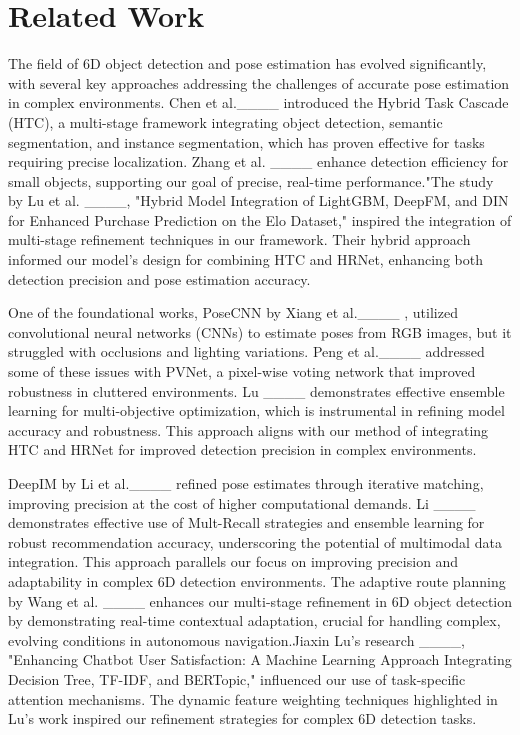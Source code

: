 \section{Related Work}
The field of 6D object detection and pose estimation has evolved significantly, with several key approaches addressing the challenges of accurate pose estimation in complex environments. Chen et al.____ introduced the Hybrid Task Cascade (HTC), a multi-stage framework integrating object detection, semantic segmentation, and instance segmentation, which has proven effective for tasks requiring precise localization. Zhang et al. ____ enhance detection efficiency for small objects, supporting our goal of precise, real-time performance."The study by Lu et al. ____, "Hybrid Model Integration of LightGBM, DeepFM, and DIN for Enhanced Purchase Prediction on the Elo Dataset," inspired the integration of multi-stage refinement techniques in our framework. Their hybrid approach informed our model's design for combining HTC and HRNet, enhancing both detection precision and pose estimation accuracy.

One of the foundational works, PoseCNN by Xiang et al.____ , utilized convolutional neural networks (CNNs) to estimate poses from RGB images, but it struggled with occlusions and lighting variations. Peng et al.____ addressed some of these issues with PVNet, a pixel-wise voting network that improved robustness in cluttered environments. Lu ____ demonstrates effective ensemble learning for multi-objective optimization, which is instrumental in refining model accuracy and robustness. This approach aligns with our method of integrating HTC and HRNet for improved detection precision in complex environments.

DeepIM by Li et al.____ refined pose estimates through iterative matching, improving precision at the cost of higher computational demands. Li ____ demonstrates effective use of Mult-Recall strategies and ensemble learning for robust recommendation accuracy, underscoring the potential of multimodal data integration. This approach parallels our focus on improving precision and adaptability in complex 6D detection environments. The adaptive route planning by Wang et al. ____ enhances our multi-stage refinement in 6D object detection by demonstrating real-time contextual adaptation, crucial for handling complex, evolving conditions in autonomous navigation.Jiaxin Lu’s research ____, "Enhancing Chatbot User Satisfaction: A Machine Learning Approach Integrating Decision Tree, TF-IDF, and BERTopic," influenced our use of task-specific attention mechanisms. The dynamic feature weighting techniques highlighted in Lu’s work inspired our refinement strategies for complex 6D detection tasks.

